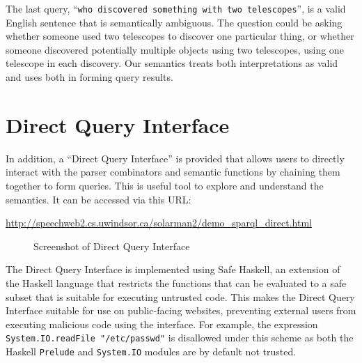 \documentclass[../main.tex]{subfiles}
\begin{document}
The last query, ``\texttt{who discovered something with two telescopes}'', is a valid English sentence that is semantically ambiguous.
The question could be asking whether someone used two telescopes to discover one particular thing, or whether someone discovered
potentially multiple objects using two telescopes, using one telescope in each discovery.  Our semantics treats both interpretations
as valid and uses both in forming query results.


\section{Direct Query Interface}

In addition, a ``Direct Query Interface'' is provided that allows users to directly interact with the parser combinators and semantic functions by chaining them together to form queries.  This is useful tool to explore and understand the semantics.  It can be accessed via this URL:

\url{http://speechweb2.cs.uwindsor.ca/solarman2/demo_sparql_direct.html}

\begin{figure}[h]
	\centering
	\caption{Screenshot of Direct Query Interface}
\end{figure}

The Direct Query Interface is implemented using Safe Haskell\cite{safehaskell}, an extension of the Haskell language that restricts the functions that can be evaluated
to a safe subset that is suitable for executing untrusted code.  This makes the Direct Query Interface suitable for use on public-facing websites, preventing external users from executing malicious code using the interface.  For example, the expression \texttt{System.IO.readFile "/etc/passwd"} is disallowed under this scheme as both the Haskell \texttt{Prelude} and \texttt{System.IO} modules are by default not trusted.
\end{document}
